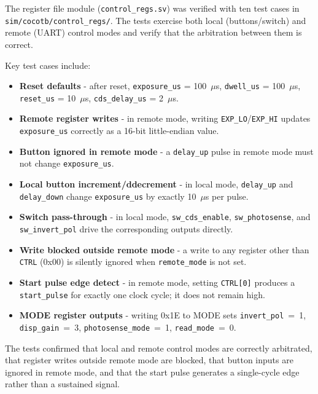 The register file module (\texttt{control\_regs.sv}) was verified with ten test cases in \texttt{sim/cocotb/control\_regs/}. The tests exercise both local (buttons/switch) and remote (UART) control modes and verify that the arbitration between them is correct.

Key test cases include:

\begin{itemize}
    \item \textbf{Reset defaults} - after reset, \texttt{exposure\_us} = 100~$\mu$s, \texttt{dwell\_us} = 100~$\mu$s, \texttt{reset\_us} = 10~$\mu$s, \texttt{cds\_delay\_us} = 2~$\mu$s.
    \item \textbf{Remote register writes} - in remote mode, writing \texttt{EXP\_LO}/\texttt{EXP\_HI} updates \texttt{exposure\_us} correctly as a 16-bit little-endian value.
    \item \textbf{Button ignored in remote mode} - a \texttt{delay\_up} pulse in remote mode must not change \texttt{exposure\_us}.
    \item \textbf{Local button increment/ddecrement} - in local mode, \texttt{delay\_up} and \texttt{delay\_down} change \texttt{exposure\_us} by exactly 10~$\mu$s per pulse.
    \item \textbf{Switch pass-through} - in local mode, \texttt{sw\_cds\_enable}, \texttt{sw\_photosense}, and \texttt{sw\_invert\_pol} drive the corresponding outputs directly.
    \item \textbf{Write blocked outside remote mode} - a write to any register other than \texttt{CTRL} (0x00) is silently ignored when \texttt{remote\_mode} is not set.
    \item \textbf{Start pulse edge detect} - in remote mode, setting \texttt{CTRL[0]} produces a \texttt{start\_pulse} for exactly one clock cycle; it does not remain high.
    \item \textbf{MODE register outputs} - writing 0x1E to MODE sets \texttt{invert\_pol}~=~1, \texttt{disp\_gain}~=~3, \texttt{photosense\_mode}~=~1, \texttt{read\_mode}~=~0.
\end{itemize}

The tests confirmed that local and remote control modes are correctly arbitrated, that register writes outside remote mode are blocked, that button inputs are ignored in remote mode, and that the start pulse generates a single-cycle edge rather than a sustained signal.


